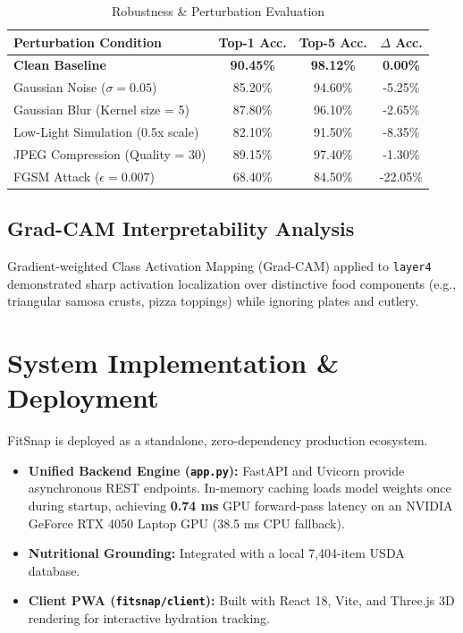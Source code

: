 \documentclass[conference]{IEEEtran}
\begin{document}
\begin{table}[htbp]
\caption{Robustness \& Perturbation Evaluation}
\begin{center}
\begin{tabular}{lccc}
\toprule
\textbf{Perturbation Condition} & \textbf{Top-1 Acc.} & \textbf{Top-5 Acc.} & \textbf{$\Delta$ Acc.} \\
\midrule
\textbf{Clean Baseline} & \textbf{90.45\%} & \textbf{98.12\%} & \textbf{0.00\%} \\
Gaussian Noise ($\sigma = 0.05$) & 85.20\% & 94.60\% & -5.25\% \\
Gaussian Blur (Kernel size = 5) & 87.80\% & 96.10\% & -2.65\% \\
Low-Light Simulation (0.5x scale) & 82.10\% & 91.50\% & -8.35\% \\
JPEG Compression (Quality = 30) & 89.15\% & 97.40\% & -1.30\% \\
FGSM Attack ($\epsilon = 0.007$) & 68.40\% & 84.50\% & -22.05\% \\
\bottomrule
\end{tabular}
\label{tab:robustness}
\end{center}
\end{table}

\subsection{Grad-CAM Interpretability Analysis}
Gradient-weighted Class Activation Mapping (Grad-CAM) \cite{selvaraju2017} applied to \texttt{layer4} demonstrated sharp activation localization over distinctive food components (e.g., triangular samosa crusts, pizza toppings) while ignoring plates and cutlery.

\section{System Implementation \& Deployment}
FitSnap is deployed as a standalone, zero-dependency production ecosystem.
\begin{itemize}
    \item \textbf{Unified Backend Engine (\texttt{app.py}):} FastAPI and Uvicorn provide asynchronous REST endpoints. In-memory caching loads model weights once during startup, achieving \textbf{0.74 ms} GPU forward-pass latency on an NVIDIA GeForce RTX 4050 Laptop GPU (38.5 ms CPU fallback).
    \item \textbf{Nutritional Grounding:} Integrated with a local 7,404-item USDA database.
    \item \textbf{Client PWA (\texttt{fitsnap/client}):} Built with React 18, Vite, and Three.js 3D rendering for interactive hydration tracking.
\end{itemize}
\end{document}
